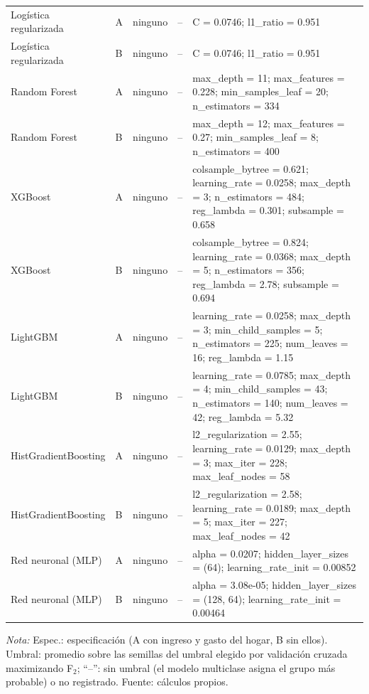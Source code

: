 {\begin{longtable}{lllc>{\raggedright\arraybackslash}p{}}
  Logística regularizada & A & ninguno & -- & C = 0.0746; l1\_ratio = 0.951 \\
  Logística regularizada & B & ninguno & -- & C = 0.0746; l1\_ratio = 0.951 \\
  Random Forest & A & ninguno & -- & max\_depth = 11; max\_features = 0.228; min\_samples\_leaf = 20; n\_estimators = 334 \\
  Random Forest & B & ninguno & -- & max\_depth = 12; max\_features = 0.27; min\_samples\_leaf = 8; n\_estimators = 400 \\
  XGBoost & A & ninguno & -- & colsample\_bytree = 0.621; learning\_rate = 0.0258; max\_depth = 3; n\_estimators = 484; reg\_lambda = 0.301; subsample = 0.658 \\
  XGBoost & B & ninguno & -- & colsample\_bytree = 0.824; learning\_rate = 0.0368; max\_depth = 5; n\_estimators = 356; reg\_lambda = 2.78; subsample = 0.694 \\
  LightGBM & A & ninguno & -- & learning\_rate = 0.0258; max\_depth = 3; min\_child\_samples = 5; n\_estimators = 225; num\_leaves = 16; reg\_lambda = 1.15 \\
  LightGBM & B & ninguno & -- & learning\_rate = 0.0785; max\_depth = 4; min\_child\_samples = 43; n\_estimators = 140; num\_leaves = 42; reg\_lambda = 5.32 \\
  HistGradientBoosting & A & ninguno & -- & l2\_regularization = 2.55; learning\_rate = 0.0129; max\_depth = 3; max\_iter = 228; max\_leaf\_nodes = 58 \\
  HistGradientBoosting & B & ninguno & -- & l2\_regularization = 2.58; learning\_rate = 0.0189; max\_depth = 5; max\_iter = 227; max\_leaf\_nodes = 42 \\
  Red neuronal (MLP) & A & ninguno & -- & alpha = 0.0207; hidden\_layer\_sizes = (64); learning\_rate\_init = 0.00852 \\
  Red neuronal (MLP) & B & ninguno & -- & alpha = 3.08e-05; hidden\_layer\_sizes = (128, 64); learning\_rate\_init = 0.00464 \\
\end{longtable}
\vspace{-\LTpost}
\textit{Nota:} Espec.: especificación (A con ingreso y gasto del hogar, B sin
ellos). Umbral: promedio sobre las semillas del umbral elegido por validación
cruzada maximizando F$_2$; ``--'': sin umbral (el modelo multiclase asigna el
grupo más probable) o no registrado. Fuente: cálculos propios.\par
}
